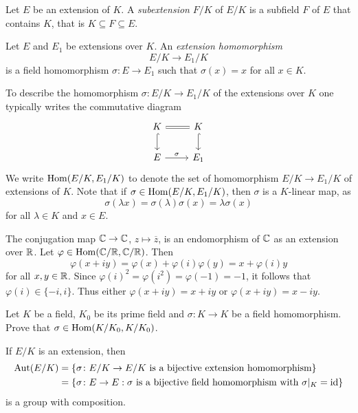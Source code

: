 \begin{definition}
	Let $E$ be an extension of $K$. A \emph{subextension} $F/K$ 
	of $E/K$ is a subfield $F$ of $E$ that contains $K$, that is
	$K\subseteq F\subseteq E$. 
\end{definition}

\begin{definition}
Let $E$ and $E_1$ be extensions over $K$. An \emph{extension
homomorphism} 
\[
E/K\to E_1/K
\]
is a field homomorphism $\sigma\colon E\to E_1$ such that $\sigma(x)=x$ for all $x\in K$. 
\end{definition}

To describe the homomorphism $\sigma\colon E/K\to E_1/K$ of the extensions over $K$
one typically writes the commutative diagram 
\[
	\begin{tikzcd}
	K & K \\
	E & {E_1} 
	\arrow["\sigma", from=2-1, to=2-2]
	\arrow[equal, no head, from=1-1, to=1-2]
	\arrow[hook, from=1-1, to=2-1]
	\arrow[hook, from=1-2, to=2-2]
\end{tikzcd}
\]
We write $\operatorname{Hom}(E/K,E_1/K)$ to denote
the set of homomorphism $E/K\to E_1/K$ of extensions of $K$. Note
that if $\sigma\in\operatorname{Hom}(E/K,E_1/K)$, then
$\sigma$ is a $K$-linear map, as
\[
	\sigma(\lambda x)=\sigma(\lambda)\sigma(x)=\lambda\sigma(x)
\]
for all $\lambda\in K$ and $x\in E$. 

\begin{example}
	The conjugation map $\mathbb{C}\to\mathbb{C}$, $z\mapsto\overline{z}$, 
	is an endomorphism of $\mathbb{C}$ as an extension over $\mathbb{R}$. Let 
	$\varphi\in\operatorname{Hom}(\mathbb{C}/\mathbb{R},\mathbb{C}/\mathbb{R})$. Then 
	\[
	\varphi(x+iy)=\varphi(x)+\varphi(i)\varphi(y)=x+\varphi(i)y
	\]
	for all $x,y\in\mathbb{R}$. Since $\varphi(i)^2=\varphi(i^2)=\varphi(-1)=-1$, 
	it follows that $\varphi(i)\in\{-i,i\}$. Thus either 
	$\varphi(x+iy)=x+iy$ or $\varphi(x+iy)=x-iy$. 
\end{example}

\begin{exercise}
\label{xca: prime field is fixed}
	Let $K$ be a field, $K_0$ be its prime field 
        and $\sigma\colon K\to K$ be a field homomorphism. Prove that 
        $\sigma\in\operatorname{Hom}(K/K_0,K/K_0)$. 
\end{exercise}

If $E/K$ is an extension, then
\begin{align*}
	\operatorname{Aut}(E/K)&=\{\sigma\colon E/K\to E/K\text{ is a bijective extension homomorphism}\}\\
 &=\{\sigma\colon E\to E:\sigma\text{ is a bijective field homomorphism with $\sigma|_K=\operatorname{id}$}\}
\end{align*}
is a group with composition.

